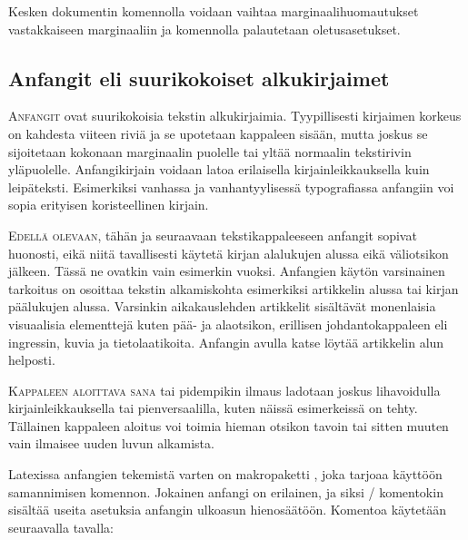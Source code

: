 \begin{koodilohkosis}
\setlength{\marginparwidth}{50bp}
\setlength{\marginparsep}{10bp}
\setlength{\marginparpush}{6bp}
\end{koodilohkosis}

Kesken dokumentin komennolla  voidaan vaihtaa
marginaalihuomautukset vastakkaiseen marginaaliin ja komennolla
 palautetaan oletusasetukset.

\subsection{Anfangit eli suurikokoiset alkukirjaimet}

\lettrine[lines=3, loversize=.06, lhang=.02, findent=-5bp, nindent=4bp,
slope=4bp]{A}{nfangit} ovat suurikokoisia tekstin alkukirjaimia.
Tyypillisesti kirjaimen korkeus on kahdesta viiteen riviä ja se
upotetaan kappaleen sisään, mutta joskus se sijoitetaan kokonaan
marginaalin puolelle tai yltää normaalin tekstirivin yläpuolelle.
Anfangikirjain voidaan latoa erilaisella kirjainleikkauksella kuin
leipäteksti. Esimerkiksi vanhassa ja vanhantyylisessä typografiassa
anfangiin voi sopia erityisen koristeellinen kirjain.

\smallskip

\lettrine[lines=2, lhang=1, nindent=0bp]{E\hspace{1.5bp}}{dellä
  olevaan}, tähän ja seuraavaan tekstikappaleeseen anfangit sopivat
huonosti, eikä niitä tavallisesti käytetä kirjan alalukujen alussa eikä
väliotsikon jälkeen. Tässä ne ovatkin vain esimerkin vuoksi. Anfangien
käytön varsinainen tarkoitus on osoittaa tekstin alkamiskohta
esimerkiksi artikkelin alussa tai kirjan päälukujen alussa. Varsinkin
aikakauslehden artikkelit sisältävät monenlaisia visuaalisia elementtejä
kuten pää- ja alaotsikon, erillisen johdantokappaleen eli ingressin,
kuvia ja tietolaatikoita. Anfangin avulla katse löytää artikkelin alun
helposti.

\lettrine[lines=1, loversize=.1, lhang=.02, findent=1.5bp]{K}{appaleen
  aloittava sana} tai pidempikin ilmaus ladotaan joskus lihavoidulla
kirjainleikkauksella tai pienversaalilla, kuten näissä esimerkeissä on
tehty. Tällainen kappaleen aloitus voi toimia hieman otsikon tavoin tai
sitten muuten vain ilmaisee uuden luvun alkamista.

Latexissa anfangien tekemistä varten on makropaketti
, joka tarjoaa käyttöön samannimisen
komennon. Jokainen anfangi on erilainen, ja siksi \-/
komentokin sisältää useita asetuksia anfangin ulkoasun hienosäätöön.
Komentoa käytetään seuraavalla tavalla:

